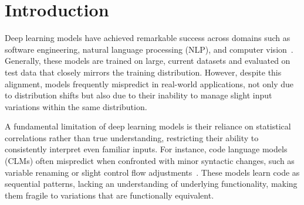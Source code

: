 \section{Introduction}


Deep learning models have achieved remarkable success across domains such as software engineering, natural language processing (NLP), and computer vision~\cite{tian2023fly, naturalattack, Zhang2023Challenging, lu2021codexglue,svyatkovskiy2020intellicode,Devlin2019BERT,Sanh2020DistilBERT,guo2021graphcodebert,Chen2021Evaluating,xiao2022repairing,xiao2021selfchecking}. Generally, these models are trained on large, current datasets and evaluated on test data that closely mirrors the training distribution. However, despite this alignment, models frequently mispredict in real-world applications, not only due to distribution shifts but also due to their inability to manage slight input variations within the same distribution.


A fundamental limitation of deep learning models is their reliance on statistical correlations rather than true understanding, restricting their ability to consistently interpret even familiar inputs. For instance, code language models (CLMs) often mispredict when confronted with minor syntactic changes, such as variable renaming or slight control flow adjustments~\cite{tian2023fly, naturalattack, Zhang2023Challenging}. These models learn code as sequential patterns, lacking an understanding of underlying functionality, making them fragile to variations that are functionally equivalent.





